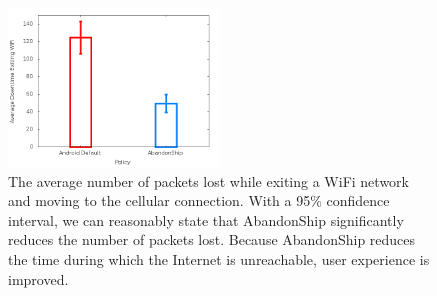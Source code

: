 \begin{figure}
	\includegraphics[width=0.5\textwidth]{bars}
	\caption{The average number of packets lost while exiting a WiFi network and moving to the cellular connection. With a 95\% confidence interval, we can reasonably state that AbandonShip significantly reduces the number of packets lost. Because AbandonShip reduces the time during which the Internet is unreachable, user experience is improved.}
\end{figure}

